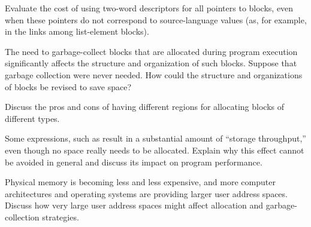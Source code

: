 Evaluate the cost of using two-word descriptors
for all pointers to blocks, even when these pointers do not correspond
to source-language values (as, for example, in the links among
list-element blocks).

The need to garbage-collect blocks that are
allocated during program execution significantly affects the structure
and organization of such blocks. Suppose that garbage collection were
never needed. How could the structure and organizations of blocks be
revised to save space?

Discuss the pros and cons of having different
regions for allocating blocks of different types.

Some expressions, such as
\noindent result in a substantial amount of ``storage
throughput,'' even though no space really needs to be
allocated. Explain why this effect cannot be avoided in general and
discuss its impact on program performance.

Physical memory is becoming less and less
expensive, and more computer architectures and operating systems are
providing larger user address spaces. Discuss how very large user
address spaces might affect allocation and garbage-collection
strategies.
